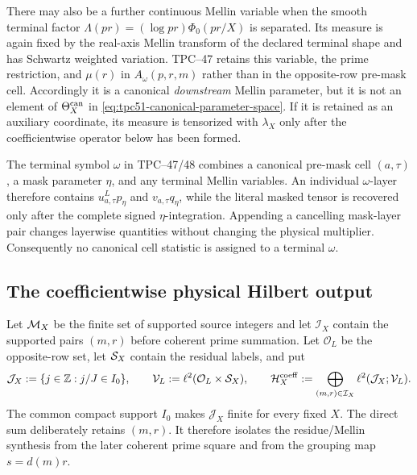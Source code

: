 There may also be a further continuous Mellin variable when the smooth
terminal factor $\Lambda(pr)=(\log pr)\Phi_0(pr/X)$ is separated.  Its
measure is again fixed by the real-axis Mellin transform of the declared
terminal shape and has Schwartz weighted variation.  TPC--47 retains this
variable, the prime restriction, and $\mu(r)$ in $A_\omega(p,r,m)$ rather
than in the opposite-row pre-mask cell.  Accordingly it is a canonical
\emph{downstream} Mellin parameter, but it is not an element of
$\Theta_X^{\rm can}$ in \eqref{eq:tpc51-canonical-parameter-space}.  If it
is retained as an auxiliary coordinate, its measure is tensorized with
$\lambda_X$ only after the coefficientwise operator below has been formed.

The terminal symbol $\omega$ in TPC--47/48 combines a canonical pre-mask
cell $(a,\tau)$, a mask parameter $\eta$, and any terminal Mellin variables.
An individual $\omega$-layer therefore contains
$u_{a,\tau}^{L}p_\eta$ and $v_{a,\tau}q_\eta$, while the literal masked tensor
is recovered only after the complete signed $\eta$-integration.  Appending a
cancelling mask-layer pair changes layerwise quantities without changing the
physical multiplier.  Consequently no canonical cell statistic is assigned
to a terminal $\omega$.

\subsection{The coefficientwise physical Hilbert output}

Let $\mathcal M_X$ be the finite set of supported source integers and let
$\mathcal I_X$ contain the supported pairs $(m,r)$ before coherent prime summation.
Let $\mathcal O_L$ be the opposite-row set, let $\mathcal S_X$ contain the residual labels,
and put
\begin{equation}
 \mathcal J_X:=\{j\in\mathbb Z:j/J\in I_0\},
 \qquad
 \mathcal V_L:=\ell^2(\mathcal O_L\times\mathcal S_X),
 \qquad
 \mathcal H_X^{\rm coeff}
 :=\bigoplus_{(m,r)\in\mathcal I_X}
   \ell^2(\mathcal J_X;\mathcal V_L).
 \label{eq:tpc51-coefficient-Hilbert-space}
\end{equation}
The common compact support $I_0$ makes $\mathcal J_X$ finite for every
fixed $X$.  The direct sum deliberately retains $(m,r)$.  It therefore isolates the
residue/Mellin synthesis from the later coherent prime square and from the
grouping map $s=d(m)r$.


